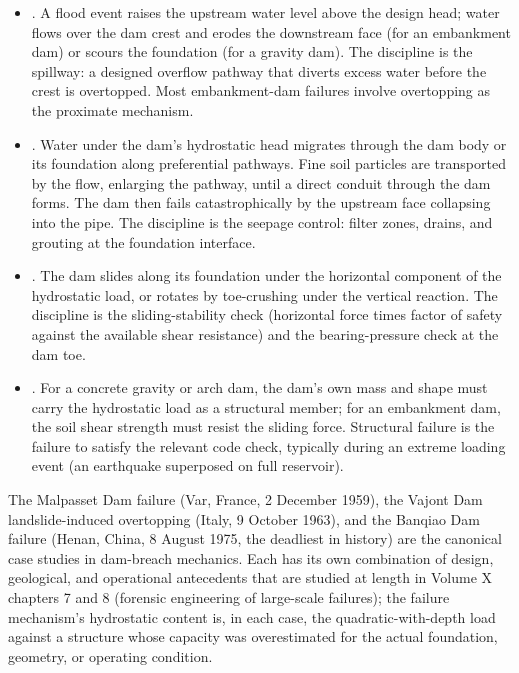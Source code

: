 \begin{itemize}[leftmargin=*]
  \item {}. A flood event raises the
    upstream water level above the design head; water flows over
    the dam crest and erodes the downstream face (for an
    embankment dam) or scours the foundation (for a gravity
    dam). The discipline is the spillway: a designed overflow
    pathway that diverts excess water before the crest is
    overtopped. Most embankment-dam failures involve overtopping
    as the proximate mechanism.
  \item {}. Water under the
    dam's hydrostatic head migrates through the dam body or its
    foundation along preferential pathways. Fine soil particles
    are transported by the flow, enlarging the pathway, until a
    direct conduit through the dam forms. The dam then fails
    catastrophically by the upstream face collapsing into the
    pipe. The discipline is the seepage control: filter zones,
    drains, and grouting at the foundation interface.
  \item {}. The dam slides along its
    foundation under the horizontal component of the hydrostatic
    load, or rotates by toe-crushing under the vertical reaction.
    The discipline is the sliding-stability check (horizontal
    force times factor of safety against the available shear
    resistance) and the bearing-pressure check at the dam toe.
  \item {}. For a
    concrete gravity or arch dam, the dam's own mass and shape
    must carry the hydrostatic load as a structural member; for
    an embankment dam, the soil shear strength must resist the
    sliding force. Structural failure is the failure to satisfy
    the relevant code check, typically during an extreme
    loading event (an earthquake superposed on full reservoir).
\end{itemize}

The Malpasset Dam failure (Var, France, 2 December 1959), the
Vajont Dam landslide-induced overtopping (Italy, 9 October 1963),
and the Banqiao Dam failure (Henan, China, 8 August 1975, the
deadliest in history) are the canonical case studies in
dam-breach mechanics. Each has its own combination of design,
geological, and operational antecedents that are studied at
length in Volume X chapters 7 and 8 (forensic engineering of
large-scale failures); the failure mechanism's hydrostatic content
is, in each case, the quadratic-with-depth load against a
structure whose capacity was overestimated for the actual
foundation, geometry, or operating condition.

